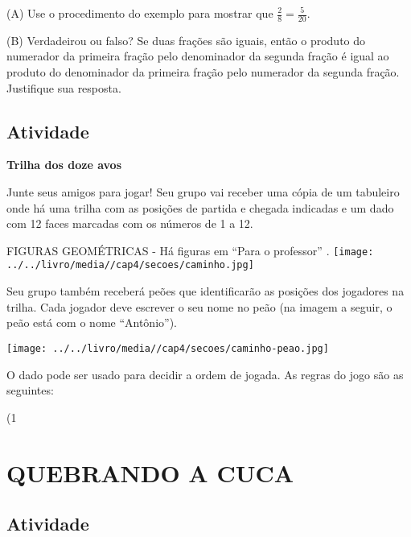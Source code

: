 \documentclass[a4,12pt]{book}
\begin{document}
(A) Use o procedimento do exemplo para mostrar que $\frac{2}{8} = \frac{5}{20}$.

(B) Verdadeirou ou falso? Se duas frações são iguais, então o produto do numerador da primeira fração pelo denominador da segunda fração é igual ao produto do denominador da primeira fração pelo numerador da segunda fração. Justifique sua resposta.









\subsection{Atividade}







{\bf Trilha dos doze avos}

Junte seus amigos para jogar! Seu grupo vai receber uma cópia de um tabuleiro onde há uma trilha com as posições de partida e chegada indicadas e um dado com 12 faces marcadas com os números de 1 a 12. 
\begin{imagem*}[breakable]{}{}   FIGURAS GEOMÉTRICAS - Há figuras em   ``Para o professor''  .  
    \texttt{[image: ../../livro/media//cap4/secoes/caminho.jpg]}  
\end{imagem*}
Seu grupo também receberá peões que identificarão as posições dos jogadores na trilha. Cada jogador deve escrever o seu nome no peão (na imagem a seguir, o peão está com o nome ``Antônio'').

\texttt{[image: ../../livro/media//cap4/secoes/caminho-peao.jpg]}

O dado pode ser usado para decidir a ordem de jogada. As regras do jogo são as seguintes:

(1

\section{QUEBRANDO A CUCA }


\subsection{Atividade}
\end{document}
